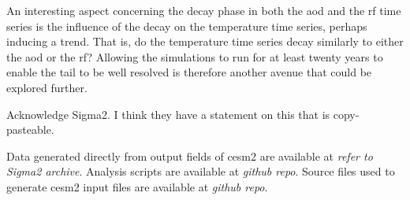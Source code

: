 \documentclass{ametsocV6.1}
\begin{document}
An interesting aspect concerning the decay phase in both the \gls{aod} and the \gls{rf}
time series is the influence of the decay on the temperature time series, perhaps
inducing a trend. That is, do the temperature time series decay similarly to either the
\gls{aod} or the \gls{rf}? Allowing the simulations to run for at least twenty years to
enable the tail to be well resolved is therefore another avenue that could be explored
further.

\clearpage
\acknowledgments{}

Acknowledge Sigma2. I think they have a statement on this that is copy-pasteable.

%
%
\datastatement{}

Data generated directly from output fields of \gls{cesm2} are available at \emph{refer
  to Sigma2 archive}. Analysis scripts are available at \emph{github repo}. Source files
used to generate \gls{cesm2} input files are available at \emph{github repo}.

%
\end{document}
